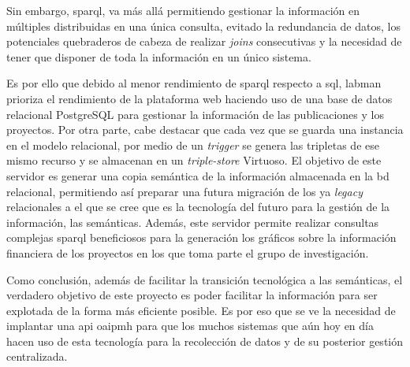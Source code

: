 Sin embargo, \acrshort{sparql}, va más allá permitiendo gestionar la información en múltiples  distribuidas en una única consulta, evitado la redundancia de datos, los potenciales quebraderos de cabeza de realizar \textit{joins} consecutivas y la necesidad de tener que disponer de toda la información en un único sistema.

Es por ello que debido al menor rendimiento de \acrshort{sparql} respecto a \acrshort{sql}, \acrshort{labman} prioriza el rendimiento de la plataforma web haciendo uso de una base de datos relacional PostgreSQL\cite{PostgreSQL} para gestionar la información de las publicaciones y los proyectos. Por otra parte, cabe destacar que cada vez que se guarda una instancia en el modelo relacional, por medio de un \textit{trigger} se genera las tripletas de ese mismo recurso y se almacenan en un \textit{triple-store} Virtuoso\cite{Virtuoso}. El objetivo de este servidor es generar una copia semántica de la información almacenada en la \acrshort{bd} relacional, permitiendo así preparar una futura migración  de los ya \textit{legacy}  relacionales a el que se cree que es la tecnología del futuro para la gestión de la información, las  semánticas. Además, este servidor permite realizar consultas complejas \acrshort{sparql} beneficiosos para la generación los gráficos sobre la información financiera de los proyectos en los que toma parte el grupo de investigación.

Como conclusión, además de facilitar la transición tecnológica a las  semánticas, el verdadero objetivo de este proyecto es poder facilitar la información para ser explotada de la forma más eficiente posible. Es por eso que se ve la necesidad de implantar una \acrfull{api} \acrshort{oaipmh} para que los muchos sistemas que aún hoy en día hacen uso de esta tecnología para la recolección de datos y de su posterior gestión centralizada.
